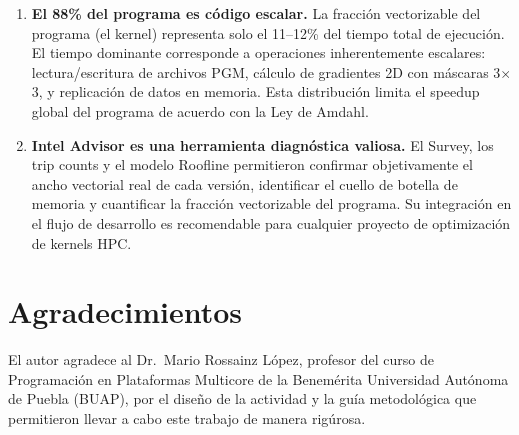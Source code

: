 \begin{enumerate}
  \item \textbf{El 88\% del programa es c\'odigo escalar.}
    La fracci\'on vectorizable del programa (el kernel) representa
    solo el 11--12\% del tiempo total de ejecuci\'on.
    El tiempo dominante corresponde a operaciones inherentemente
    escalares: lectura/escritura de archivos PGM, c\'alculo
    de gradientes 2D con m\'ascaras 3$\times$3, y replicaci\'on
    de datos en memoria.
    Esta distribuci\'on limita el speedup global del programa de
    acuerdo con la Ley de Amdahl.

  \item \textbf{Intel Advisor es una herramienta diagn\'ostica
    valiosa.}
    El Survey, los trip counts y el modelo Roofline permitieron
    confirmar objetivamente el ancho vectorial real de cada
    versi\'on, identificar el cuello de botella de memoria y
    cuantificar la fracci\'on vectorizable del programa.
    Su integraci\'on en el flujo de desarrollo es recomendable
    para cualquier proyecto de optimizaci\'on de kernels HPC.
\end{enumerate}

\section*{Agradecimientos}

El autor agradece al Dr.~Mario Rossainz L\'opez, profesor del
curso de Programaci\'on en Plataformas Multicore de la Benem\'erita
Universidad Aut\'onoma de Puebla (BUAP), por el dise\~no de la
actividad y la gu\'ia metodol\'ogica que permitieron llevar a cabo
este trabajo de manera rig\'urosa.
